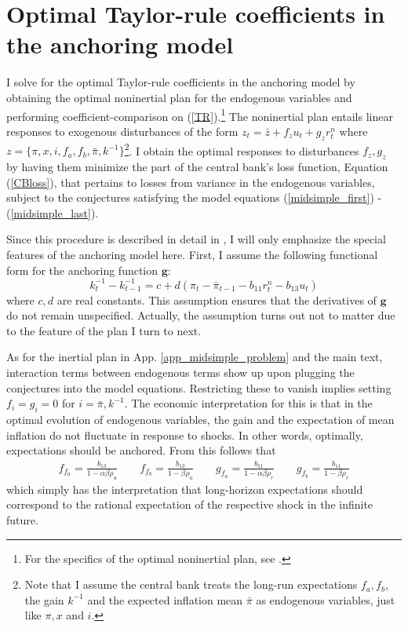 \documentclass[11pt]{article}
\renewcommand{\[}{\begin{equation}}
\renewcommand{\]}{\end{equation}}
\begin{document}
\section{Optimal Taylor-rule coefficients in the anchoring model} \label{app_oni}
I solve for the optimal Taylor-rule coefficients in the anchoring model by obtaining the optimal noninertial plan for the endogenous variables and performing coefficient-comparison on (\ref{TR}).\footnote{For the specifics of the optimal noninertial plan, see \cite{woodford2011interest}.} The noninertial plan entails linear responses to exogenous disturbances of the form $z_t = \bar{z} + f_z u_t + g_z r_t^n$ where $z = \{\pi,x,i, f_a, f_b, \bar{\pi}, k^{-1}\}$\footnote{Note that I assume the central bank treats the long-run expectations $f_{a}, f_b$, the gain $k^{-1}$ and the expected inflation mean $\bar{\pi}$ as endogenous variables, just like $\pi, x$ and $i$.}. I obtain the optimal responses to disturbances $f_z, g_z$ by having them minimize the part of the central bank's loss function, Equation (\ref{CBloss}), that pertains to losses from variance in the endogenous variables, subject to the conjectures satisfying the model equations (\ref{midsimple_first}) - (\ref{midsimple_last}). 

Since this procedure is described in detail in \cite{woodford2011interest}, I will only emphasize the special features of the anchoring model here. First, I assume the following functional form for the anchoring function $\mathbf{g}$:
\begin{equation}
k_t^{-1} -k_{t-1}^{-1} = c + d(\pi_t -\bar{\pi}_{t-1} - b_{11}r_t^n - b_{13}u_t)
\end{equation}
where $c,d$ are real constants. This assumption ensures that the derivatives of $\mathbf{g}$ do not remain unspecified. Actually, the assumption turns out not to matter due to the feature of the plan I turn to next. 

As for the inertial plan in App. \ref{app_midsimple_problem} and the main text, interaction terms between endogenous terms show up upon plugging the conjectures into the model equations. Restricting these to vanish implies setting $f_i = g_i=0$ for $i = \bar{\pi}, k^{-1}$. The economic interpretation for this is that in the optimal evolution of endogenous variables, the gain and the expectation of mean inflation do not fluctuate in response to shocks. In other words, optimally, expectations should be anchored. From this follows that 
\begin{align}
f_{f_a} = \frac{b_{13}}{1-\alpha  \beta  \rho _u}\quad \quad  f_{f_b}=  \frac{b_{13}}{1-\beta  \rho _u} \quad \quad g_{f_a}  = \frac{b_{11}}{1-\alpha  \beta  \rho _r} \quad \quad g_{f_b} = \frac{b_{11}}{1-\beta  \rho _r}
\end{align}
which simply has the interpretation that long-horizon expectations should correspond to the rational expectation of the respective shock in the infinite future.
\end{document}
